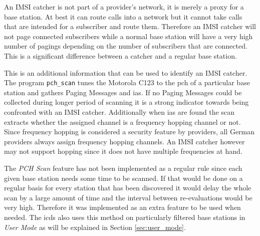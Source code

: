 An IMSI catcher is not part of a provider's network, it is merely a proxy for a base station.
At best it can route calls into a network but it cannot take calls that are intended for a subscriber and route them.
Therefore an IMSI catcher will not page connected subscribers while a normal base station will have a very high number of pagings depending on the number of subscribers that are connected.
This is a significant difference between a catcher and a regular base station.

This is an additional information that can be used to identify an IMSI catcher.
The program \texttt{pch\_scan} tunes the Motorola C123 to the \gls{pch} of a particular base station and gathers Paging Messages and \glspl{ia}.
If no Paging Messages could be collected during longer period of scanning it is a strong indicator towards being confronted with an IMSI catcher.
Additionally when \glspl{ia} are found the scan extracts whether the assigned channel is a frequency hopping channel or not.
Since frequency hopping is considered a security feature by providers, all German providers always assign frequency hopping channels.
An IMSI catcher however may not support hopping since it does not have multiple frequencies at hand.

The \emph{PCH Scan} feature has not been implemented as a regular rule since each given base station needs some time to be scanned.
If that would be done on a regular basis for every station that has been discovered it would delay the whole scan by a large amount of time and the interval between re-evaluations would be very high.
Therefore it was implemented as an extra feature to be used when needed.
The \gls{icds} also uses this method on particularly filtered base stations in \emph{User Mode} as will be explained in Section \ref{sec:user_mode}.

